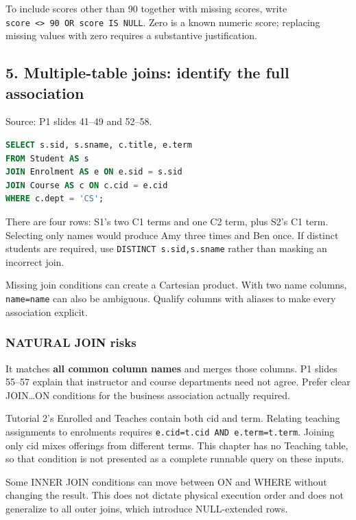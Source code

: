 To include scores other than 90 together with missing scores, write \texttt{score\ \textless{}\textgreater{}\ 90\ OR\ score\ IS\ NULL}. Zero is a known numeric score; replacing missing values with zero requires a substantive justification.

\subsection{5. Multiple-table joins: identify the full association}\label{06_sql_queries_en-multiple-table-joins-identify-the-full-association}

Source: P1 slides 41--49 and 52--58.

\Needspace{105pt}
\begin{lstlisting}[language=SQL]
SELECT s.sid, s.sname, c.title, e.term
FROM Student AS s
JOIN Enrolment AS e ON e.sid = s.sid
JOIN Course AS c ON c.cid = e.cid
WHERE c.dept = 'CS';
\end{lstlisting}

There are four rows: S1's two C1 terms and one C2 term, plus S2's C1 term. Selecting only names would produce Amy three times and Ben once. If distinct students are required, use \texttt{DISTINCT\ s.\allowbreak{}sid,\allowbreak{}s.\allowbreak{}sname} rather than masking an incorrect join.

Missing join conditions can create a Cartesian product. With two name columns, \texttt{name=name} can also be ambiguous. Qualify columns with aliases to make every association explicit.

\subsubsection{NATURAL JOIN risks}\label{06_sql_queries_en-natural-join-risks}

It matches \textbf{all common column names} and merges those columns. P1 slides 55--57 explain that instructor and course departments need not agree. Prefer clear JOIN\ldots ON conditions for the business association actually required.

Tutorial 2's Enrolled and Teaches contain both cid and term. Relating teaching assignments to enrolments requires \texttt{e.\allowbreak{}cid=t.\allowbreak{}cid\ AND\ e.\allowbreak{}term=t.\allowbreak{}term}. Joining only cid mixes offerings from different terms. This chapter has no Teaching table, so that condition is not presented as a complete runnable query on these inputs.

Some INNER JOIN conditions can move between ON and WHERE without changing the result. This does not dictate physical execution order and does not generalize to all outer joins, which introduce NULL-extended rows.

